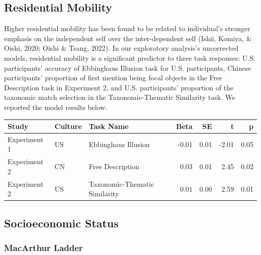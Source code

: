 \documentclass[
  man,floatsintext]{apa6}
\begin{document}
\hypertarget{residential-mobility}{%
\subsection{Residential Mobility}\label{residential-mobility}}

Higher residential mobility has been found to be related to individual's stronger emphasis on the independent self over the inter-dependent self (Ishii, Komiya, \& Oishi, 2020; Oishi \& Tsang, 2022). In our exploratory analysis's uncorrected models, residential mobility is a significant predictor to three task responses: U.S. participants' accuracy of Ebbinghaus Illusion task for U.S. participants, Chinese participants' proportion of first mention being focal objects in the Free Description task in Experiment 2, and U.S. participants' proportion of the taxonomic match selection in the Taxonomic-Thematic Similarity task. We reported the model results below.

\begin{table}
\centering\begingroup\fontsize{9.5}{11.5}\selectfont

\begin{tabular}{l|l|l|r|r|r|r}
\hline
Study & Culture & Task Name & Beta & SE & t & p\\
\hline
Experiment 1 & US & Ebbinghaus Illusion & -0.01 & 0.01 & -2.01 & 0.05\\
Experiment 2 & CN & Free Description & 0.03 & 0.01 & 2.45 & 0.02\\
Experiment 2 & US & Taxonomic-Thematic Similarity & 0.01 & 0.00 & 2.59 & 0.01\\
\hline
\end{tabular}
\endgroup{}
\end{table}

\hypertarget{socioeconomic-status}{%
\subsection{Socioeconomic Status}\label{socioeconomic-status}}

\hypertarget{macarthur-ladder}{%
\subsubsection{MacArthur Ladder}\label{macarthur-ladder}}
\end{document}
